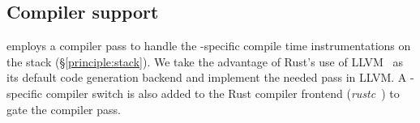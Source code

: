 \subsection{Compiler support}
\label{impl:compiler}
\projname{} employs a compiler pass to handle the \projname{}-specific
    compile time instrumentations on the stack (\S\ref{principle:stack}).
We take the advantage of Rust's use of LLVM~\cite{llvm} as its default code
    generation backend and implement the needed pass in LLVM.
A \projname{}-specific compiler switch is also added to the Rust compiler
    frontend (\emph{rustc}~\cite{rustc}) to gate the \projname{} compiler pass.
